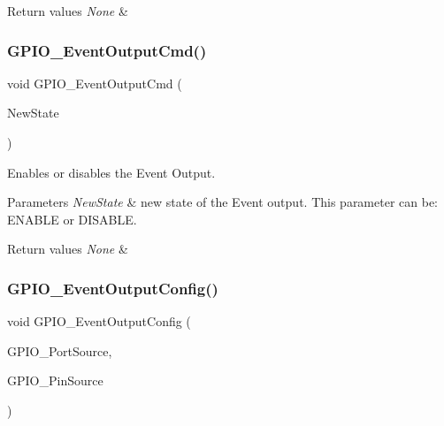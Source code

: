 \begin{DoxyRetVals}{Return values}
{\em None} & \\
\hline
\end{DoxyRetVals}
\mbox{\label{group___g_p_i_o___exported___functions_gaf13ab3d59e467df44b492f1cdfe2f588}} 
\subsubsection{\texorpdfstring{GPIO\_EventOutputCmd()}{GPIO\_EventOutputCmd()}}
{\footnotesize\ttfamily void G\+P\+I\+O\+\_\+\+Event\+Output\+Cmd (\begin{DoxyParamCaption}\item[{\mbox{\hyperlink{group___exported__types_gac9a7e9a35d2513ec15c3b537aaa4fba1}{Functional\+State}}}]{New\+State }\end{DoxyParamCaption})}



Enables or disables the Event Output. 


\begin{DoxyParams}{Parameters}
{\em New\+State} & new state of the Event output. This parameter can be\+: E\+N\+A\+B\+LE or D\+I\+S\+A\+B\+LE. \\
\hline
\end{DoxyParams}

\begin{DoxyRetVals}{Return values}
{\em None} & \\
\hline
\end{DoxyRetVals}
\mbox{\label{group___g_p_i_o___exported___functions_ga935f31ed7a86c6cb594cf34313b4b7af}} 
\subsubsection{\texorpdfstring{GPIO\_EventOutputConfig()}{GPIO\_EventOutputConfig()}}
{\footnotesize\ttfamily void G\+P\+I\+O\+\_\+\+Event\+Output\+Config (\begin{DoxyParamCaption}\item[{uint8\+\_\+t}]{G\+P\+I\+O\+\_\+\+Port\+Source,  }\item[{uint8\+\_\+t}]{G\+P\+I\+O\+\_\+\+Pin\+Source }\end{DoxyParamCaption})}



